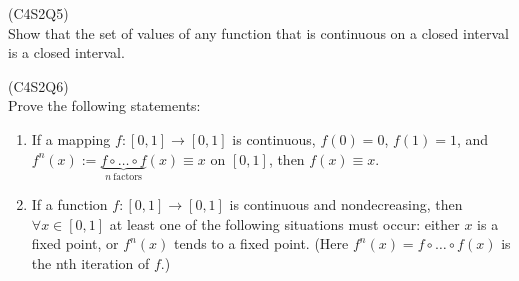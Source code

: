 \begin{prb}
    (C4S2Q5) \\
    Show that the set of values of any function that is continuous on a closed interval is a closed interval.
\end{prb}

\begin{prb}
    (C4S2Q6) \\
    Prove the following statements:
    \begin{enumerate}
        \item[a)] If a mapping $f : [0, 1] \rightarrow [0, 1]$ is continuous, $f(0) = 0$, $f(1) = 1$, and $f^n(x) := \underbrace{f \circ \ldots \circ f}_{n\ \text{factors}} (x) \equiv x$ on $[0, 1]$, 
        then $f(x) \equiv x$.
        \item[b)] If a function $f : [0, 1] \rightarrow [0, 1]$ is continuous and nondecreasing, then $\forall x \in [0, 1]$ at least one of the following situations must occur: either $x$ is 
        a fixed point, or $f^n(x)$ tends to a fixed point. (Here $f^n(x) = f \circ \ldots \circ f(x)$ is the nth iteration of $f$.)
    \end{enumerate}
\end{prb}

